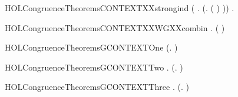 \begin{SaveVerbatim}{HOLCongruenceTheoremsCONTEXTXXstrongind}
       (\HOLSymConst{\HOLTokenForall{}} .
              \HOLSymConst{\HOLTokenConj{}}   \HOLSymConst{\HOLTokenImp{}}
             (\HOLTokenLambda{}.  ( ) )) \HOLSymConst{\HOLTokenImp{}}
       \HOLSymConst{\HOLTokenForall{}}.   \HOLSymConst{\HOLTokenImp{}}  
\end{SaveVerbatim}
\newcommand{\HOLCongruenceTheoremsCONTEXTXXstrongind}{\UseVerbatim{HOLCongruenceTheoremsCONTEXTXXstrongind}}
\begin{SaveVerbatim}{HOLCongruenceTheoremsCONTEXTXXWGXXcombin}
\HOLTokenTurnstile{} \HOLSymConst{\HOLTokenForall{}} .   \HOLSymConst{\HOLTokenConj{}}   \HOLSymConst{\HOLTokenImp{}}  ( \HOLConst{\HOLTokenCompose} )
\end{SaveVerbatim}
\newcommand{\HOLCongruenceTheoremsCONTEXTXXWGXXcombin}{\UseVerbatim{HOLCongruenceTheoremsCONTEXTXXWGXXcombin}}
\begin{SaveVerbatim}{HOLCongruenceTheoremsGCONTEXTOne}
\HOLTokenTurnstile{}  (\HOLTokenLambda{}. )
\end{SaveVerbatim}
\newcommand{\HOLCongruenceTheoremsGCONTEXTOne}{\UseVerbatim{HOLCongruenceTheoremsGCONTEXTOne}}
\begin{SaveVerbatim}{HOLCongruenceTheoremsGCONTEXTTwo}
\HOLTokenTurnstile{} \HOLSymConst{\HOLTokenForall{}}.  (\HOLTokenLambda{}. )
\end{SaveVerbatim}
\newcommand{\HOLCongruenceTheoremsGCONTEXTTwo}{\UseVerbatim{HOLCongruenceTheoremsGCONTEXTTwo}}
\begin{SaveVerbatim}{HOLCongruenceTheoremsGCONTEXTThree}
\HOLTokenTurnstile{} \HOLSymConst{\HOLTokenForall{}} .   \HOLSymConst{\HOLTokenImp{}}  (\HOLTokenLambda{}.  )
\end{SaveVerbatim}
\newcommand{\HOLCongruenceTheoremsGCONTEXTThree}{\UseVerbatim{HOLCongruenceTheoremsGCONTEXTThree}}
